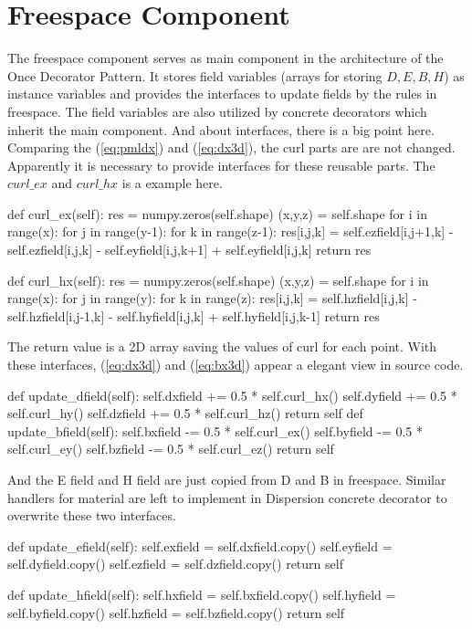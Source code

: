 \section{Freespace Component}
The freespace component serves as main component in the architecture of the Once Decorator Pattern. It stores field
variables (arrays for storing $D, E, B, H$) as instance variables and provides the interfaces to update fields by the
rules in freespace. The field variables are also utilized by concrete decorators which inherit the main component. And
about interfaces, there is a big point here. Comparing the (\ref{eq:pmldx}) and (\ref{eq:dx3d}), the curl parts are
are not changed. Apparently it is necessary to provide interfaces for these reusable parts. The $curl\_ex$ and
$curl\_hx$ is a example here.
\begin{code}
    def curl_ex(self):
        res = numpy.zeros(self.shape)
        (x,y,z) = self.shape
        for i in range(x):
            for j in range(y-1):
                for k in range(z-1):
                    res[i,j,k] = self.ezfield[i,j+1,k] - self.ezfield[i,j,k] 
                               - self.eyfield[i,j,k+1] + self.eyfield[i,j,k]
        return res

    def curl_hx(self):
        res = numpy.zeros(self.shape)
        (x,y,z) = self.shape
        for i in range(x):
            for j in range(y):
                for k in range(z):
                    res[i,j,k] = self.hzfield[i,j,k] - self.hzfield[i,j-1,k] 
                               - self.hyfield[i,j,k] + self.hyfield[i,j,k-1]
        return res
\end{code}
The return value is a 2D array saving the values of curl for each point. With these interfaces, (\ref{eq:dx3d}) and
(\ref{eq:bx3d}) appear a elegant view in source code.
\begin{code}
    def update_dfield(self):
        self.dxfield += 0.5 * self.curl_hx()
        self.dyfield += 0.5 * self.curl_hy()
        self.dzfield += 0.5 * self.curl_hz()
        return self
    def update_bfield(self):
        self.bxfield -= 0.5 * self.curl_ex()
        self.byfield -= 0.5 * self.curl_ey()
        self.bzfield -= 0.5 * self.curl_ez()
        return self
\end{code}
And the E field and H field are just copied from D and B in freespace. Similar handlers for material are left to
implement in Dispersion concrete decorator to overwrite these two interfaces.
\begin{code}
    def update_efield(self):
        self.exfield = self.dxfield.copy()
        self.eyfield = self.dyfield.copy()
        self.ezfield = self.dzfield.copy()
        return self

    def update_hfield(self):
        self.hxfield = self.bxfield.copy()
        self.hyfield = self.byfield.copy()
        self.hzfield = self.bzfield.copy()
        return self
\end{code}


